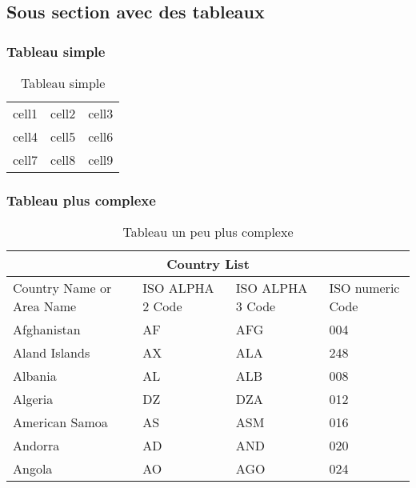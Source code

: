 \subsection{Sous section avec des tableaux}%
\label{sec:subsectiontableau}

\subsubsection{Tableau simple}

\begin{table}[h!]
    \centering
    \begin{tabular}{ |c|c|c| } 
        \hline
        cell1 & cell2 & cell3 \\ 
        cell4 & cell5 & cell6 \\ 
        cell7 & cell8 & cell9 \\ 
        \hline
    \end{tabular}
    \caption{Tableau simple}%
    \label{table:tableausimple}
\end{table}


\subsubsection{Tableau plus complexe}

\begin{table}[h!]
    \begin{tabular}{ |p{3cm}||p{3cm}|p{3cm}|p{3cm}|  }
        \hline
        \multicolumn{4}{|c|}{Country List} \\
        \hline
        Country Name     or Area Name& ISO ALPHA 2 Code &ISO ALPHA 3 Code&ISO numeric Code\\
        \hline
        Afghanistan   & AF    &AFG&   004\\
        Aland Islands&   AX  & ALA   &248\\
        Albania &AL & ALB&  008\\
        Algeria    &DZ & DZA&  012\\
        American Samoa&   AS  & ASM&016\\
        Andorra& AD  & AND   &020\\
        Angola& AO  & AGO&024\\
        \hline
    \end{tabular}
    \centering
    \caption{Tableau un peu plus complexe}%
    \label{table:tableaucomplexe}
\end{table}


